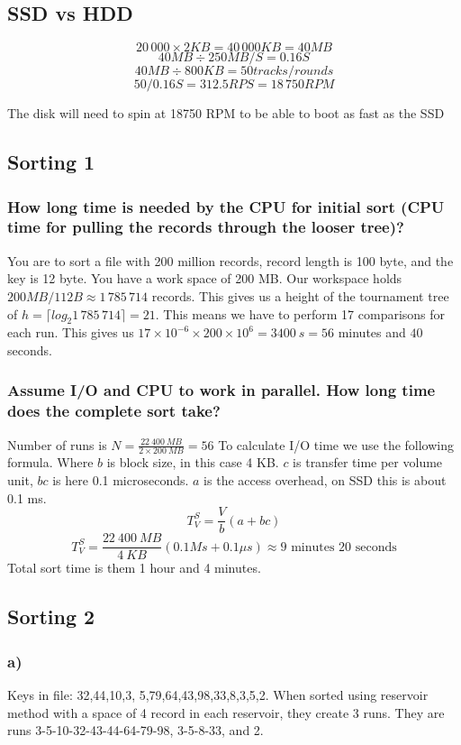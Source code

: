 \documentclass{article}
\begin{document}
\subsection{SSD vs HDD}
\[
    20\,000 \times 2KB = 40\,000 KB = 40 MB
\]
\[
    40 MB \div 250 MB/S = 0.16 S
\]
\[
    40 MB \div 800KB = 50 tracks/rounds
\]
\[ 
    50 / 0.16 S = 312.5 RPS =  18\,750 RPM
\]

The disk will need to spin at 18750 RPM to be able to boot as fast as the SSD

\subsection*{Sorting 1}
\subsubsection*{How long time is needed by the CPU for initial sort (CPU time
    for pulling the records through
the looser tree)?}

You are to sort a file with 200 million records, record length is 100 byte, and
the key is 12 byte. You have a work space of 200 MB.
Our workspace holds $200 MB / 112 B \approx 1\,785\,714$ records. This gives us a
height of the tournament tree of $h = \lceil log_2 1\,785\,714 \rceil = 21$.
This means we have to perform 17 comparisons for each run. This gives us $17
\times 10^{-6} \times 200 \times 10^6 = 3400\: s = 56$ minutes and $40$ seconds.

\subsubsection*{Assume I/O and CPU to work in parallel. How long time does the
complete sort take?}
Number of runs is $ N = \frac{22\:400\:MB}{2 \times 200\:MB} = 56 $
To calculate I/O time we use the following formula. Where $b$ is block size, in
this case 4 KB. $c$ is transfer time per volume unit, $bc$ is here 0.1
microseconds. $a$ is the access overhead, on SSD this is about 0.1 ms.
\[
    T_V^S = \frac{V}{b}\left(a+bc\right)
\]
\[
    T_V^S = \frac{22\:400\:MB}{4\:KB}(0.1 Ms + 0.1 \mu s) \approx 
    \mbox{9 minutes 20 seconds}
\]
Total sort time is them 1 hour and 4 minutes.

\subsection*{Sorting 2}
\subsubsection*{a)}
Keys in file: 32,44,10,3, 5,79,64,43,98,33,8,3,5,2. 
When sorted using reservoir method with a space of 4 record in each reservoir, they create 3 runs.
They are runs 3-5-10-32-43-44-64-79-98, 3-5-8-33, and 2.
\end{document}
